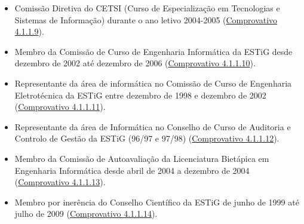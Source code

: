\documentclass[11pt]{article}
\begin{document}
\begin{itemize}
\item {Comissão Diretiva do CETSI (Curso de Especialização em Tecnologias e Sistemas de Informação) durante o ano letivo 2004-2005 (\href{run:MissaoIPBCargos/avaliacaoReestruturacao.pdf}{Comprovativo 4.1.1.9}).}
\item {Membro da Comissão de Curso de Engenharia Informática da ESTiG desde dezembro de 2002 até dezembro de 2006 (\href{run:MissaoIPBCargos/CP.pdf}{Comprovativo 4.1.1.10}).}
\item {Representante da área de informática no Comissão de Curso de Engenharia Eletrotécnica da ESTiG entre dezembro de 1998 e dezembro de 2002 (\href{run:MissaoIPBCargos/CP.pdf}{Comprovativo 4.1.1.11}).}
\item {Representante da área de Informática no Conselho de Curso de Auditoria e Controlo de Gestão da ESTiG (96/97 e 97/98) (\href{run:MissaoIPBCargos/InfACG.pdf}{Comprovativo 4.1.1.12}).}
\item {Membro da Comissão de Autoavaliação da Licenciatura Bietápica em Engenharia Informática desde abril de 2004 a dezembro de 2004 (\href{run:MissaoIPBCargos/CALEI.pdf}{Comprovativo 4.1.1.13}).}
\item {Membro por inerência do Conselho Científico da ESTiG de junho de 1999 até julho de 2009 (\href{run:MissaoIPBCargos/ConselhoCientifico.pdf}{Comprovativo 4.1.1.14}). }
\end{itemize}
\end{document}

